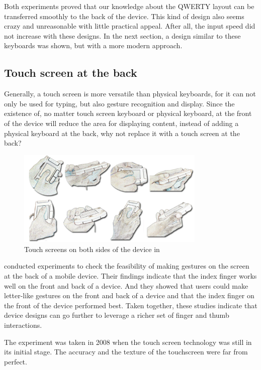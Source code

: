 \documentclass[11pt]{article}
\begin{document}
Both experiments proved that our knowledge about the QWERTY layout can be transferred smoothly to the back of the device. This kind of design also seems crazy and unreasonable with little practical appeal. After all, the input speed did not increase with these designs. In the next section, a design similar to these keyboards was shown, but with a more modern approach.

\subsection{Touch screen at the back}
Generally, a touch screen is more versatile than physical keyboards, for it can not only be used for typing, but also gesture recognition and display. Since the existence of, no matter touch screen keyboard or physical keyboard, at the front of the device will reduce the area for displaying content, instead of adding a physical keyboard at the back, why not replace it with a touch screen at the back?

\begin{figure}[H]
  \centering
  \includegraphics[width=0.8\textwidth]{HandPostureFrontBack.png}
  \caption{Touch screens on both sides of the device in \citep{10.1016/j.ijhcs.2008.03.004}}
  \label{fig:handposturefrontback}
\end{figure}

\citet{10.1016/j.ijhcs.2008.03.004} conducted experiments to check the feasibility of making gestures on the screen at the back of a mobile device. Their findings indicate that the index finger works well on the front and back of a device. And they showed that users could make letter-like gestures on the front and back of a device and that the index finger on the front of the device performed best. Taken together, these studies indicate that device designs can go further to leverage a richer set of finger and thumb interactions. 

The experiment was taken in 2008 when the touch screen technology was still in its initial stage. The accuracy and the texture of the touchscreen were far from perfect.
\end{document}
